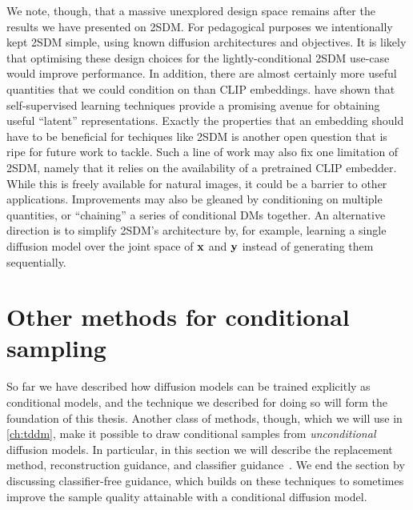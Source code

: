 We note, though, that a massive unexplored design space remains after the results we have presented on 2SDM. For pedagogical purposes we intentionally kept 2SDM simple, using known diffusion architectures and objectives. It is likely that optimising these design choices for the lightly-conditional 2SDM use-case would improve performance. In addition, there are almost certainly more useful quantities that we could condition on than CLIP embeddings. 
\citet{bao2022conditional,hu2022self} have shown that self-supervised learning techniques provide a promising avenue for obtaining useful ``latent'' representations. Exactly the properties that an embedding should have to be beneficial for techiques like 2SDM is another open question that is ripe for future work to tackle. Such a line of work may also fix one limitation of 2SDM, namely that it relies on the availability of a pretrained CLIP embedder. While this is freely available for natural images, it could be a barrier to other applications. Improvements may also be gleaned by conditioning on multiple quantities, or ``chaining'' a series of conditional DMs together. An alternative direction is to simplify 2SDM's architecture by, for example, learning a single diffusion model over the joint space of ${\mathbf{x}}$ and ${\mathbf{y}}$ instead of generating them sequentially.

\section{Other methods for conditional sampling} \label{sec:other-methods-for-conditional-sampling}
So far we have described how diffusion models can be trained explicitly as conditional models, and the technique we described for doing so will form the foundation of this thesis. Another class of methods, though, which we will use in \cref{ch:tddm}, make it possible to draw conditional samples from \textit{unconditional} diffusion models. In particular, in this section we will describe the replacement method, reconstruction guidance, and classifier guidance~\citep{song2020score,kadkhodaie2020solving,mittal2021symbolic,ho2022video}. We end the section by discussing classifier-free guidance, which builds on these techniques to sometimes improve the sample quality attainable with a conditional diffusion model.

